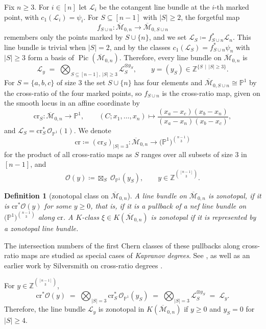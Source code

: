 \documentclass[11pt,a4paper,reqno]{amsart}
\theoremstyle{results}
\theoremstyle{definitions}
\newtheorem{definition}[thm]{Definition}
\def\Z{\mathbb{Z}}
\def\P{\mathbb{P}}
\def\Z{\mathbb{Z}}
\newcommand{\Pic}{\operatorname{Pic}}
\newcommand{\cL}{\mathcal{L}}
\newcommand{\cO}{\mathcal{O}}
\newcommand{\Mbar}{\overline{\mathcal M}}
\begin{document}
Fix $n \geqslant 3$.  For $i \in [n]$ let $\cL_i$ be the cotangent line bundle at
the $i$-th marked point, with $c_1(\cL_i) = \psi_i$.  For $S \subseteq [n-1]$ with $|S|\geqslant2$, the
forgetful map
\[
  f_{S \cup n} \colon \Mbar_{0,n} \longrightarrow \Mbar_{0,S \cup n}
\]
remembers only the points marked by $S \cup \{n\}$, and we set
$\cL_S \coloneqq f_{S \cup n}^{*}\cL_n$.  This line bundle is trivial when $|S| = 2$,
and by \cite[\S 1.4]{larson2024k} the classes $c_1(\cL_S) = f^*_{S \cup n}\psi_n$
with $|S| \geqslant 3$ form a basis of $\Pic(\Mbar_{0,n})$.  Therefore, every line bundle on
$\Mbar_{0,n}$ is 
\begin{equation}
  \label{eq:line-bundle-Mbar-0n}
  \cL_y \;=\; \bigotimes_{S \subseteq [n-1],\ |S| \geqslant 3} \cL_S^{\otimes y_S},
  \qquad y = (y_S) \in \Z^{\{S\,\mid\,|S| \geqslant 3\}} .
\end{equation}
For $S = \{a,b,c\}$ of size $3$ the set $S \cup \{n\}$ has four elements and
$\Mbar_{0,S \cup n} \cong \P^1$ by the cross-ratio of the four marked points, so
$f_{S \cup n}$ is the cross-ratio map, given on the smooth locus in an affine coordinate by
\[
  \textrm{cr}_S \colon \Mbar_{0,n} \longrightarrow \P^1, \qquad
  (C; x_1, \ldots, x_n) \longmapsto
  \frac{(x_a - x_c)(x_b - x_n)}{(x_a - x_n)(x_b - x_c)} ,
\]
and $\cL_S = \textrm{cr}_S^{*}\,\cO_{\P^1}(1)$.  We denote
\[
  \textrm{cr} \coloneqq (\textrm{cr}_S)_{|S| = 3} \colon \Mbar_{0,n} \longrightarrow
  \big(\P^1\big)^{\binom{n-1}{3}}
\]
for the product of all cross-ratio maps as $S$ ranges over all subsets of size $3$ in $[n-1]$, and
\[
\cO(y) \coloneqq \boxtimes_S \; \cO_{\P^1}(y_S), \qquad y \in \Z^{\binom{[n-1]}{3}}.
\]

\begin{definition}[zonotopal class on $\Mbar_{0,n}$]\label{def:m0n-zonotopal}
  A line bundle on $\Mbar_{0,n}$ is \emph{zonotopal}, if it is
  $\textrm{cr}^{*}\cO(y)$ for some $y \geqslant 0$, that is, if it is a pullback
  of a nef line bundle on $\big(\P^1\big)^{\binom{n-1}{3}}$ along $\textrm{cr}$.
  A $K$-class $\xi \in K(\Mbar_{0,n})$ is \emph{zonotopal} if it is represented by
  a zonotopal line bundle.
\end{definition}
The intersection numbers of the first Chern classes of these pullbacks along cross-ratio maps are studied as special cases of \emph{Kapranov degrees}. 
See \cite{brakensiek2025kapranov}, as well as an earlier work by Silversmith on cross-ratio degrees \cite{silversmith2022cross}. 

For $y \in \Z^{\binom{[n-1]}{3}}$,
\[
  \textrm{cr}^{*}\cO(y) \;=\; \bigotimes_{|S| = 3} \textrm{cr}_S^{*}\,\cO_{\P^1}(y_S)
  \;=\; \bigotimes_{|S| = 3} \cL_S^{\otimes y_S} \;=\; \cL_y .
\]
Therefore, the line bundle $\cL_y$ is zonotopal in $K(\Mbar_{0, n})$ if $y \geqslant 0$ and $y_S = 0$
for $|S| \geqslant 4$.
\end{document}
